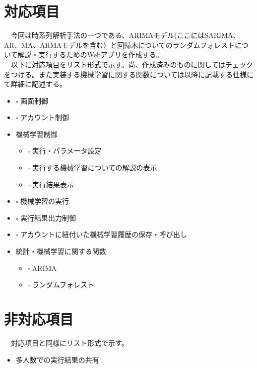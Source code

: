 \documentclass{scrartcl}
\begin{document}
\section{対応項目}
\label{sec:org19b7850}
　今回は時系列解析手法の一つである、ARIMAモデル(ここにはSARIMA、AR、MA、ARMAモデルを含む）と回帰木についてのランダムフォレストについて解説・実行するためのWebアプリを作成する。\\
　以下に対応項目をリスト形式で示す。尚、作成済みのものに関してはチェックをつける。また実装する機械学習に関する関数については以降に記載する仕様にて詳細に記述する。\\
\begin{itemize}
\item $\square$ 画面制御\\
\item $\square$ アカウント制御\\
\item\relax [\%] 機械学習制御\\
\begin{itemize}
\item $\square$ 実行・パラメータ設定\\
\item $\square$ 実行する機械学習についての解説の表示\\
\item $\square$ 実行結果表示\\
\end{itemize}
\item $\square$ 機械学習の実行\\
\item $\square$ 実行結果出力制御\\
\item $\square$ アカウントに紐付いた機械学習履歴の保存・呼び出し\\
\item\relax [\%] 統計・機械学習に関する関数\\
\begin{itemize}
\item $\square$ ARIMA\\
\item $\square$ ランダムフォレスト\\
\end{itemize}
\end{itemize}

\section{非対応項目}
\label{sec:org8303930}
　対応項目と同様にリスト形式で示す。\\
\begin{itemize}
\item 多人数での実行結果の共有\\
\end{itemize}
\end{document}
